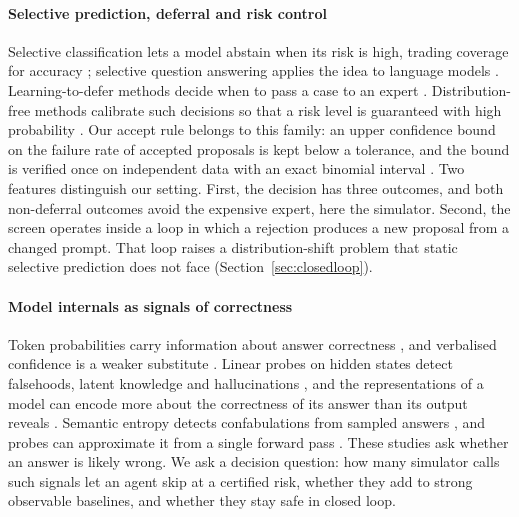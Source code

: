 \paragraph{Selective prediction, deferral and risk control}
Selective classification lets a model abstain when its risk is high, trading coverage for accuracy
\citep{geifman2017selective}; selective question answering applies the idea to language models
\citep{kamath2020selective}. Learning-to-defer methods decide when to pass a case to an expert
\citep{madras2018defer,mozannar2020defer}. Distribution-free methods calibrate such decisions so that a risk
level is guaranteed with high probability \citep{bates2021rcps,angelopoulos2021ltt,angelopoulos2023gentle}. Our
accept rule belongs to this family: an upper confidence bound on the failure rate of accepted proposals is kept
below a tolerance, and the bound is verified once on independent data with an exact binomial interval
\citep{clopper1934}. Two features distinguish our setting. First, the decision has three outcomes, and both
non-deferral outcomes avoid the expensive expert, here the simulator. Second, the screen operates inside a loop
in which a rejection produces a new proposal from a changed prompt. That loop raises a distribution-shift
problem that static selective prediction does not face (Section~\ref{sec:closedloop}).

\paragraph{Model internals as signals of correctness}
Token probabilities carry information about answer correctness \citep{kadavath2022know}, and verbalised
confidence is a weaker substitute \citep{xiong2024verbalized}. Linear probes on hidden states
\citep{alain2016probes,belinkov2022probing} detect falsehoods, latent knowledge and hallucinations
\citep{azaria2023internal,burns2023ccs,marks2023geometry,chen2024inside}, and the representations of a model can
encode more about the correctness of its answer than its output reveals \citep{orgad2025llms}. Semantic entropy
detects confabulations from sampled answers \citep{kuhn2023semantic,farquhar2024semantic}, and probes can
approximate it from a single forward pass \citep{kossen2024sep}. These studies ask whether an answer is likely
wrong. We ask a decision question: how many simulator calls such signals let an agent skip at a certified risk,
whether they add to strong observable baselines, and whether they stay safe in closed loop.

